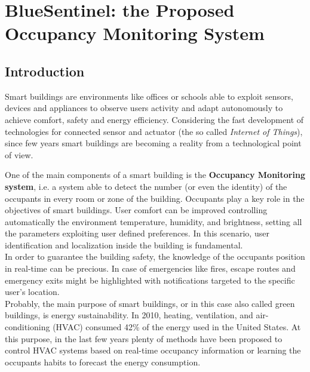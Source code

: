%
%
\chapter[BlueSentinel: the Occupancy Monitoring System]{BlueSentinel: the Proposed Occupancy Monitoring System}
%
\label{cap:bluesentinel}

\section{Introduction}
\label{sec:intro}

Smart buildings are environments like offices or schools able to exploit sensors, devices and appliances to observe users activity and adapt autonomously to achieve comfort, safety and energy efficiency. Considering the fast development of technologies for connected sensor and actuator (the so called \emph{Internet of Things}), since few years smart buildings are becoming a reality from a technological point of view.

\medskip
One of the main components of a smart building is the \textbf{Occupancy Monitoring system}, i.e. a system able to detect the number (or even the identity) of the occupants in every room or zone of the building. Occupants play a key role in the objectives of smart buildings. User comfort can be improved controlling automatically the environment temperature, humidity, and brightness, setting all the parameters exploiting user defined preferences. In this scenario, user identification and localization inside the building is fundamental.\\
In order to guarantee the building safety, the knowledge of the occupants position in real-time can be precious. In case of emergencies like fires, escape routes and emergency exits might be highlighted with notifications targeted to the specific user's location.\\
Probably, the main purpose of smart buildings, or in this case also called green buildings, is energy sustainability.
In 2010, heating, ventilation, and air-conditioning (HVAC) consumed 42\% of the energy used in the United States.
At this purpose, in the last few years plenty of methods have been proposed to control HVAC systems based on real-time occupancy information or learning the occupants habits to forecast the energy consumption.

